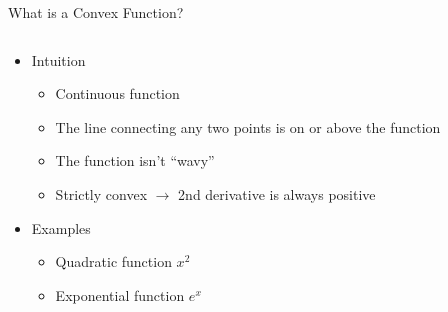 \documentclass[aspectratio=169]{beamer}
\begin{document}
\begin{frame}{What is a Convex Function?}


\begin{columns}
\begin{column}{0.7\textwidth}
\begin{itemize}
\item Intuition
\begin{itemize}
\item Continuous function 
\item The line connecting any two points is on or above the function
\item The function isn't ``wavy''
\item Strictly convex $\rightarrow$ 2nd derivative is always positive
\end{itemize}
\item Examples
\begin{itemize}
\item Quadratic function $x^2$
\item Exponential function $e^x$
\end{itemize}


\end{itemize}
\end{column}
\end{columns}
\end{frame}
\end{document}
